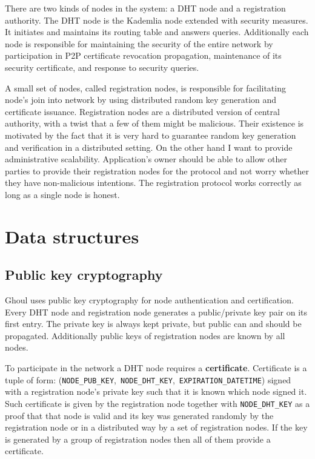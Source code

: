 There are two kinds of nodes in the system: a DHT node and a registration
authority. The DHT node is the Kademlia node extended with security measures.
It initiates and maintains its routing table and answers queries. Additionally
each node is responsible for maintaining the security of the entire network by
participation in P2P certificate revocation propagation, maintenance of its
security certificate, and response to security queries.

A small set of nodes, called registration nodes, is responsible for facilitating
node’s join into network by using distributed random key generation and
certificate issuance. Registration nodes are a distributed version of central
authority, with a twist that a few of them might be malicious. Their existence
is motivated by the fact that it is very hard to guarantee random key generation
and verification in a distributed setting. On the other hand I want to provide
administrative scalability. Application's owner should be able to allow other
parties to provide their registration nodes for the protocol and not worry
whether they have non-malicious intentions. The registration protocol works
correctly as long as a single node is honest.

\section{Data structures}

\subsection{Public key cryptography}
Ghoul uses public key cryptography for node authentication and certification.
Every DHT node and registration node generates a public/private key pair on its
first entry. The private key is always kept private, but public can and should
be propagated. Additionally public keys of registration nodes are known by all
nodes.

To participate in the network a DHT node requires a \textbf{certificate}.
Certificate is a tuple of form:
(\texttt{NODE\_PUB\_KEY},~\texttt{NODE\_DHT\_KEY},~\texttt{EXPIRATION\_DATETIME})
signed with a registration node's private key such that it is known which node
signed it. Such certificate is given by the registration node together with
\texttt{NODE\_DHT\_KEY} as a proof that that node is valid and its key was
generated randomly by the registration node or in a distributed way by a set of
registration nodes. If the key is generated by a group of registration nodes
then all of them provide a certificate.

